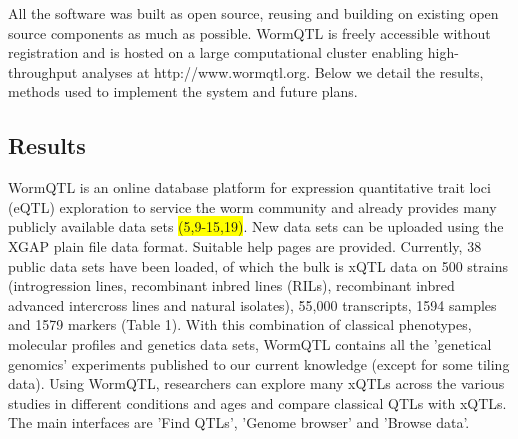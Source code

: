 All the software was built as open source, reusing and building on existing open source components 
as much as possible. WormQTL is freely accessible without registration and is hosted on a large 
computational cluster enabling high-throughput analyses at http://www.wormqtl.org. Below we detail 
the results, methods used to implement the system and future plans.

\subsection{Results}
WormQTL is an online database platform for expression quantitative trait loci (eQTL) exploration 
to service the worm community and already provides many publicly available data sets 
\colorbox{yellow}{(5,9-15,19)}. New data sets can be uploaded using the XGAP plain file data 
format. Suitable help pages are provided. 
Currently, 38 public data sets have been loaded, of which the bulk is xQTL data on 500 strains 
(introgression lines, recombinant inbred lines (RILs), recombinant inbred advanced intercross lines 
and natural isolates), 55,000 transcripts, 1594 samples and 1579 markers (Table 1). With this 
combination of classical phenotypes, molecular profiles and genetics data sets, WormQTL contains 
all the 'genetical genomics' experiments published to our current knowledge (except for some tiling 
data). Using WormQTL, researchers can explore many xQTLs across the various studies in different 
conditions and ages and compare classical QTLs with xQTLs. The main interfaces are 'Find QTLs', 
'Genome browser' and 'Browse data'.

